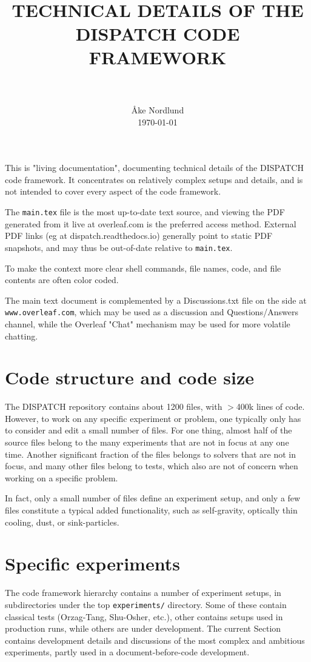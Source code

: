 \documentclass[paper=a4,fontsize=11pt]{scrartcl}
\title{
		\usefont{OT1}{bch}{b}{n}
		\normalfont \normalsize \textsc{} \\ [25pt]
		\horrule{0.5pt} \\[0.4cm]
		\Large TECHNICAL DETAILS OF THE DISPATCH CODE FRAMEWORK \\
		\horrule{2pt} \\[0.5cm]
}
\author{
		\normalfont \normalsize
        Åke Nordlund\\[-3pt]		\normalsize
        \today
}
\date{}
\numberwithin{equation}{section}		%
\numberwithin{figure}{section}			%
\numberwithin{table}{section}				%
\newcommand{\txtcolor}{\color{Mahogany}}
\newcommand{\codecolor}{\color{Blue}}
\newcommand{\cmdcolor}{\color{ForestGreen}}
\newcommand{\filecolor}{\color{NavyBlue}}
\begin{document}
\maketitle

\selectfont

\noindent
This is "living documentation", documenting technical details of the DISPATCH code framework.  It concentrates on relatively complex setups and details, and is not intended to cover every aspect of the code framework.

The \verb|main.tex| file is the most up-to-date text source, and viewing the PDF generated from it live at overleaf.com is the preferred access method.  External PDF links (eg at dispatch.readthedocs.io) generally point to static PDF snapshots, and may thus be out-of-date relative to \verb|main.tex|.

To make the context more clear {\cmdcolor shell commands}, {\filecolor file names}, {\codecolor code}, and {\txtcolor file contents} are often color coded.

The main text document is complemented by a Discussions.txt file on the side at \texttt{www.overleaf.com}, which may be used as a discussion and Questions/Answers channel, while the Overleaf "Chat" mechanism may be used for more volatile chatting.

\tableofcontents 

\section{Code structure and code size}
The DISPATCH repository contains about 1200 files, with $>$400k lines of code.  However, to work on any specific experiment or problem, one typically only has to consider and edit a small number of files.  For one thing, almost half of the source files belong to the many experiments that are not in focus at any one time.  Another significant fraction of the files belongs to solvers that are not in focus, and many other files belong to tests, which also are not of concern when working on a specific problem.

In fact, only a small number of files define an experiment setup, and only a few files constitute a typical added functionality, such as self-gravity, optically thin cooling, dust, or sink-particles.


\section{Specific experiments}
The code framework hierarchy contains a number of experiment setups, in subdirectories under the top \verb|experiments/| directory.  Some of these contain classical tests (Orzag-Tang, Shu-Osher, etc.), other contains setups used in production runs, while others are under development.  The current Section contains development details and discussions of the most complex and ambitious experiments, partly used in a document-before-code development.
\end{document}

